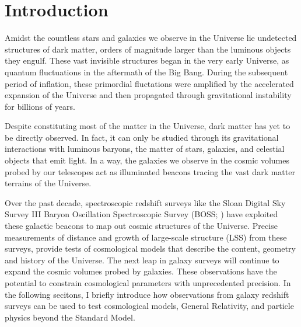 \chapter*{Introduction}
Amidst the countless stars and galaxies we observe in the Universe lie 
undetected structures of dark matter, orders of magnitude larger than 
the luminous objects they engulf. These vast invisible structures began 
in the very early Universe, as quantum fluctuations in the aftermath of 
the Big Bang. During the subsequent period of inflation, these primordial fluctations 
were amplified by the accelerated expansion of the Universe and then 
propagated through gravitational instability for billions of years. 

Despite constituting most of the matter in the Universe, dark matter 
has yet to be directly observed. In fact, it can only be studied through 
its gravitational interactions with luminous baryons, the matter of
stars, galaxies, and celestial objects that emit light. 
In a way, the galaxies we observe in the cosmic volumes probed by our 
telescopes act as illuminated beacons tracing the vast dark matter 
terrains of the Universe.

Over the past decade, spectroscopic redshift surveys like the 
Sloan Digital Sky Survey III Baryon Oscillation Spectroscopic Survey 
(BOSS; \citealt{Anderson:2012aa, Dawson:2013aa}) have 
exploited these galactic beacons to map out cosmic structures
of the Universe. Precise measurements of distance and growth 
of large-scale structure (LSS) from these surveys, provide tests 
of cosmological models that describe the content, geometry and history 
of the Universe. 
The next leap in galaxy surveys will continue to expand the cosmic 
volumes probed by galaxies. These observations have the potential 
to constrain cosmological parameters with unprecedented precision. 
In the following secitons, I briefly introduce how observations from galaxy
redshift surveys can be used to test cosmological models, 
General Relativity, and particle physics beyond the Standard Model.




